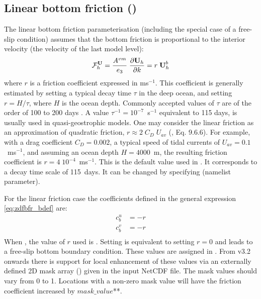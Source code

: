 \documentclass[../main/NEMO_manual]{subfiles}
\begin{document}
\subsection{Linear bottom friction (\protect{})}
\label{subsec:ZDF_bfr_linear}

The linear bottom friction parameterisation (including the special case of a free-slip condition) assumes that
the bottom friction is proportional to the interior velocity (\ie the velocity of the last model level):
\[
  {\cal F}_h^\textbf{U} = \frac{A^{vm}}{e_3} \; \frac{\partial \textbf{U}_h}{\partial k} = r \; \textbf{U}_h^b
\]
where $r$ is a friction coefficient expressed in ms$^{-1}$.
This coefficient is generally estimated by setting a typical decay time $\tau$ in the deep ocean, 
and setting $r = H / \tau$, where $H$ is the ocean depth.
Commonly accepted values of $\tau$ are of the order of 100 to 200 days \citep{Weatherly_JMR84}.
A value $\tau^{-1} = 10^{-7}$~s$^{-1}$ equivalent to 115 days, is usually used in quasi-geostrophic models.
One may consider the linear friction as an approximation of quadratic friction, $r \approx 2\;C_D\;U_{av}$
(\citet{Gill1982}, Eq. 9.6.6).
For example, with a drag coefficient $C_D = 0.002$, a typical speed of tidal currents of $U_{av} =0.1$~m\;s$^{-1}$,
and assuming an ocean depth $H = 4000$~m, the resulting friction coefficient is $r = 4\;10^{-4}$~m\;s$^{-1}$.
This is the default value used in \NEMO. It corresponds to a decay time scale of 115~days.
It can be changed by specifying  (namelist parameter).

For the linear friction case the coefficients defined in the general expression \autoref{eq:zdfbfr_bdef} are: 
\[
  \begin{split}
    c_b^u &= - r\\
    c_b^v &= - r\\
  \end{split}
\]
When , the value of $r$ used is .
Setting  is equivalent to setting $r=0$ and
leads to a free-slip bottom boundary condition.
These values are assigned in .
From v3.2 onwards there is support for local enhancement of these values via an externally defined 2D mask array
() given in the  input NetCDF file.
The mask values should vary from 0 to 1.
Locations with a non-zero mask value will have the friction coefficient increased by
$mask\_value$**.
\end{document}
